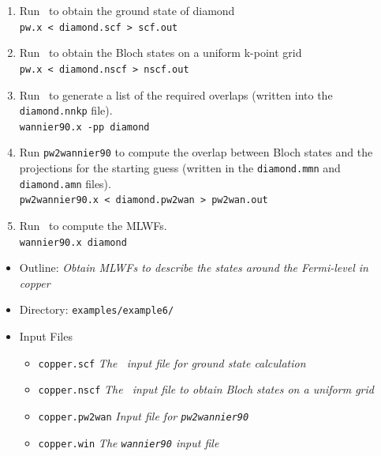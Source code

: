 \documentclass[a4paper,11pt,twoside]{article}
\begin{document}
\begin{enumerate}
\item Run \pwscf\ to obtain the ground state of diamond\\
{\tt pw.x < diamond.scf > scf.out}

\item Run \pwscf\ to obtain the Bloch states on a uniform k-point grid\\
{\tt pw.x < diamond.nscf > nscf.out}

\item Run \wannier\ to generate a list of the required overlaps (written
  into the {\tt diamond.nnkp} file).\\ 
{\tt wannier90.x -pp diamond}

\item Run {\tt pw2wannier90} to compute the overlap between Bloch
  states and the projections for the starting guess (written in the
  {\tt diamond.mmn} and {\tt diamond.amn} files).\\  
{\tt pw2wannier90.x < diamond.pw2wan > pw2wan.out}

\item Run \wannier\ to compute the MLWFs.\\
{\tt wannier90.x diamond}
\end{enumerate}



\begin{itemize}
\item{Outline: \it{Obtain MLWFs to describe the states around the
    Fermi-level in copper}}
\item{Directory: {\tt examples/example6/}}
\item{Input Files}
\begin{itemize}
\item{ {\tt copper.scf}  {\it The \pwscf\ input file for ground state
    calculation}} 
\item{ {\tt copper.nscf}  {\it The \pwscf\ input file to obtain Bloch states
    on a uniform grid}} 
\item{ {\tt copper.pw2wan}  {\it Input file for {\tt pw2wannier90}}}
\item{ {\tt copper.win}  {\it The {\tt wannier90} input file}}
\end{itemize}

\end{itemize}
\end{document}
